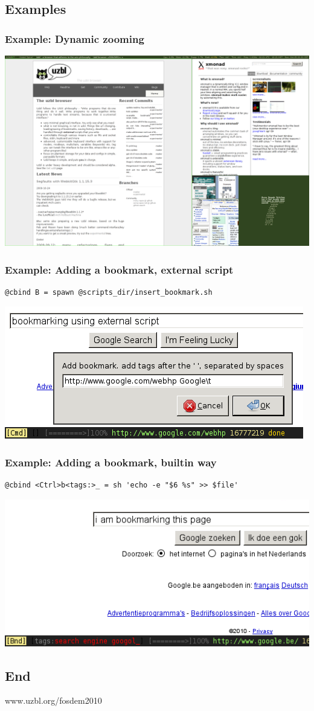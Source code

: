\documentclass{beamer}
\begin{document}
\subsection {Examples} %

\frame
{
\frametitle{Example: Dynamic zooming}
\includegraphics[scale=0.2]{dynzoom.png}
}

\begin{frame}[fragile]
\frametitle{Example: Adding a bookmark, external script}
\begin{lstlisting}
@cbind B = spawn @scripts_dir/insert_bookmark.sh
\end{lstlisting}
\includegraphics[scale=0.6]{bookmark-script-statusbar.png}  
\end{frame}

\begin{frame}[fragile]
\frametitle{Example: Adding a bookmark, builtin way}
\begin{lstlisting}
@cbind <Ctrl>b<tags:>_ = sh 'echo -e "$6 %s" >> $file'
\end{lstlisting}
\includegraphics[scale=0.6]{bookmark-builtin-statusbar.png}
\end{frame}

\subsection{End}
\frame
{
\LARGE
\begin{center}www.uzbl.org/fosdem2010\end{center}
}
\end{document}
